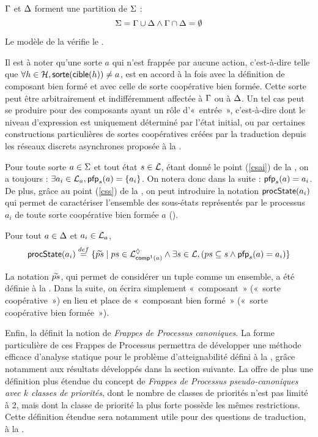 \begin{critere}
  $\components$ et $\cs$ forment une partition de $\PHs$ :
  \[\PHs = \components \cup \cs \wedge \components \cap \cs = \emptyset\]
\end{critere}

\begin{example}
  Le modèle de la  vérifie le .
\end{example}

Il est à noter qu'une sorte $a$ qui n'est frappée par aucune action,
c'est-à-dire telle que $\forall h \in \PHh, \sort{\target{h}} \neq a$,
est en accord à la fois avec la définition de composant bien formé
et avec celle de sorte coopérative bien formée.
Cette sorte peut être arbitrairement et indifféremment affectée à $\components$ ou à $\cs$.
Un tel cas peut se produire pour des composants ayant un rôle d'«~entrée~»,
c'est-à-dire dont le niveau d'expression est uniquement déterminé par l'état initial,
ou par certaines constructions particulières de sortes coopératives créées par la traduction
depuis les réseaux discrets asynchrones proposée à la .

Pour toute sorte $a \in \PHs$ et tout état $s \in \PHl$,
étant donné le point (\ref{csai}) de la , on a toujours :
$\exists a_i \in \PHl_a, \pfp_s(a) = \{ a_i \}$.
On notera donc dans la suite : $\pfp_s(a) = a_i$.
De plus, grâce au point (\ref{css}) de la , on peut introduire la notation
$\csState(a_i)$ qui permet de caractériser l'ensemble des sous-états représentés par le
processus $a_i$ de toute sorte coopérative bien formée $a$ ().

\begin{definition}[$\csState : \PHproc \rightarrow \powerset(\PHproc)$]
\label{def:csState}
  Pour tout $a \in \cs$ et $a_i \in \PHl_a$, 
    \[\csState(a_i) \DEF \{ \toset{ps} \mid ps \in \PHsubl[\PHl]_{\compin(a)} \wedge
      \exists s \in \PHl, (ps \subseteq s \wedge \pfp_s(a) = a_i) \}\]
\end{definition}

La notation $\toset{ps}$,
qui permet de considérer un tuple comme un ensemble,
a été définie à la .
Dans la suite, on écrira simplement «~composant~» (\resp «~sorte coopérative~»)
en lieu et place de «~composant bien formé~» (\resp «~sorte coopérative bien formée~»).

Enfin, la  définit la notion de \emph{Frappes de Processus canoniques}.
La forme particulière de ces Frappes de Processus permettra de développer une méthode efficace
d'analyse statique pour le problème d'atteignabilité défini à la ,
grâce notamment aux résultats développés dans la section suivante.
La  offre de plus une définition plus étendue du concept
de \emph{Frappes de Processus pseudo-canoniques avec $k$ classes de priorités},
dont le nombre de classes de priorités n'est pas limité à 2,
mais dont la classe de priorité la plus forte possède les mêmes restrictions.
Cette définition étendue sera notamment utile pour des questions de traduction,
à la .

